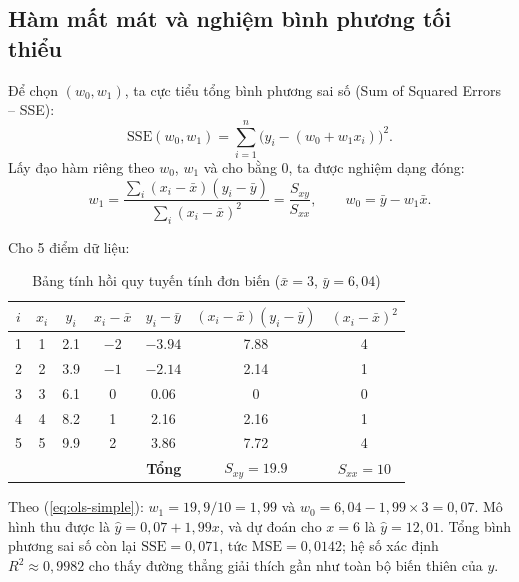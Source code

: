 \subsection{Hàm mất mát và nghiệm bình phương tối thiểu}

Để chọn $(w_0, w_1)$, ta cực tiểu tổng bình phương sai số (Sum of Squared Errors -- SSE):
\begin{equation}
    \mathrm{SSE}(w_0, w_1) = \sum_{i=1}^{n} \big(y_i - (w_0 + w_1 x_i)\big)^2 .
\end{equation}
Lấy đạo hàm riêng theo $w_0$, $w_1$ và cho bằng 0, ta được nghiệm dạng đóng:
\begin{equation}
    w_1 = \frac{\sum_{i}(x_i - \bar{x})(y_i - \bar{y})}{\sum_{i}(x_i - \bar{x})^2} = \frac{S_{xy}}{S_{xx}}, \qquad
    w_0 = \bar{y} - w_1 \bar{x}.
    \label{eq:ols-simple}
\end{equation}

\begin{example}
Cho 5 điểm dữ liệu:
\end{example}

\begin{table}[H]
\centering
\begin{tabular}{|c|c|c|c|c|c|c|}
\hline
$i$ & $x_i$ & $y_i$ & $x_i - \bar{x}$ & $y_i - \bar{y}$ & $(x_i - \bar{x})(y_i - \bar{y})$ & $(x_i - \bar{x})^2$ \\
\hline
1 & 1 & 2.1 & $-2$ & $-3.94$ & 7.88 & 4 \\ \hline
2 & 2 & 3.9 & $-1$ & $-2.14$ & 2.14 & 1 \\ \hline
3 & 3 & 6.1 & 0 & 0.06 & 0 & 0 \\ \hline
4 & 4 & 8.2 & 1 & 2.16 & 2.16 & 1 \\ \hline
5 & 5 & 9.9 & 2 & 3.86 & 7.72 & 4 \\ \hline
\multicolumn{5}{|r|}{\textbf{Tổng}} & $S_{xy} = 19.9$ & $S_{xx} = 10$ \\
\hline
\end{tabular}
\caption{Bảng tính hồi quy tuyến tính đơn biến ($\bar{x} = 3$, $\bar{y} = 6{,}04$)}
\label{tab:ols}
\end{table}

Theo (\ref{eq:ols-simple}): $w_1 = 19{,}9/10 = 1{,}99$ và $w_0 = 6{,}04 - 1{,}99 \times 3 = 0{,}07$. Mô hình thu được là $\hat{y} = 0{,}07 + 1{,}99x$, và dự đoán cho $x = 6$ là $\hat{y} = 12{,}01$. Tổng bình phương sai số còn lại $\mathrm{SSE} = 0{,}071$, tức $\mathrm{MSE} = 0{,}0142$; hệ số xác định $R^2 \approx 0{,}9982$ cho thấy đường thẳng giải thích gần như toàn bộ biến thiên của $y$.

